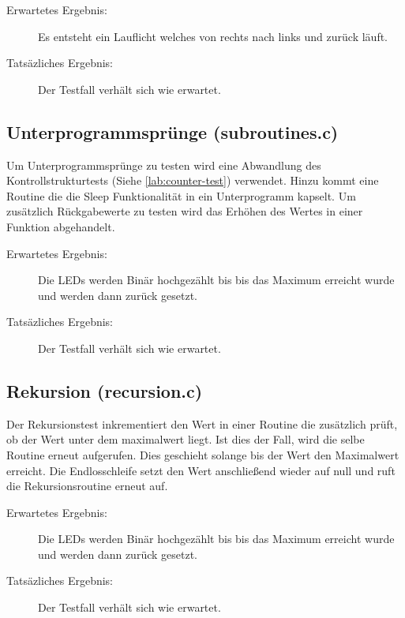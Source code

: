             \begin{description}
                \item[Erwartetes Ergebnis:] Es entsteht ein Lauflicht welches von
                rechts nach links und zurück läuft.
                \item[Tatsäzliches Ergebnis:] Der Testfall verhält sich wie erwartet.
            \end{description}

        \subsection{Unterprogrammsprünge (subroutines.c)}
            Um Unterprogrammsprünge zu testen wird eine Abwandlung des Kontrollstrukturtests
            (Siehe \ref{lab:counter-test}) verwendet. Hinzu kommt eine Routine die
            die Sleep Funktionalität in ein Unterprogramm kapselt. Um zusätzlich Rückgabewerte zu testen
            wird das Erhöhen des Wertes in einer Funktion abgehandelt.

            \begin{description}
                \item[Erwartetes Ergebnis:] Die LEDs werden Binär hochgezählt bis
                bis das Maximum erreicht wurde und werden dann zurück gesetzt.
                \item[Tatsäzliches Ergebnis:] Der Testfall verhält sich wie erwartet.
            \end{description}

        \subsection{Rekursion (recursion.c)}
            Der Rekursionstest inkrementiert den Wert in einer Routine die
            zusätzlich prüft, ob der Wert unter dem maximalwert liegt.
            Ist dies der Fall, wird die selbe Routine erneut aufgerufen.
            Dies geschieht solange bis der Wert den Maximalwert erreicht.
            Die Endlosschleife setzt den Wert anschließend wieder auf null und 
            ruft die Rekursionsroutine erneut auf.

            \begin{description}
                \item[Erwartetes Ergebnis:] Die LEDs werden Binär hochgezählt bis
                bis das Maximum erreicht wurde und werden dann zurück gesetzt.
                \item[Tatsäzliches Ergebnis:] Der Testfall verhält sich wie erwartet.
            \end{description}

